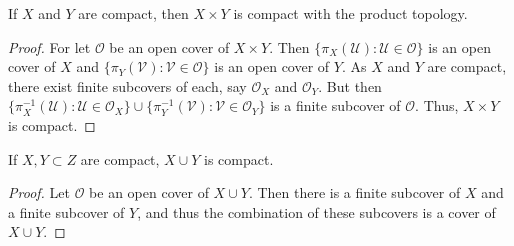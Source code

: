 \documentclass[crop=false,class=book]{standalone}
\begin{document}
\begin{theorem}
If $X$ and $Y$ are compact, then $X\times Y$ is compact with the product topology.
\end{theorem}
\begin{proof}
For let $\mathscr{O}$ be an open cover of $X\times Y$. Then $\{\pi_X(\mathscr{U}):\mathscr{U}\in \mathscr{O}\}$ is an open cover of $X$ and $\{\pi_{Y}(\mathscr{V}):\mathscr{V}\in \mathscr{O}\}$ is an open cover of $Y$. As $X$ and $Y$ are compact, there exist finite subcovers of each, say $\mathcal{O}_X$ and $\mathcal{O}_Y$. But then $\{\pi_{X}^{-1}(\mathcal{U}):\mathcal{U}\in \mathcal{O}_X\}\cup \{\pi_{Y}^{-1}(\mathcal{V}):\mathcal{V}\in \mathcal{O}_Y\}$ is a finite subcover of $\mathscr{O}$. Thus, $X\times Y$ is compact.
\end{proof}
\begin{theorem}
If $X,Y\subset Z$ are compact, $X\cup Y$ is compact.
\end{theorem}
\begin{proof}
Let $\mathcal{O}$ be an open cover of $X\cup Y$. Then there is a finite subcover of $X$ and a finite subcover of $Y$, and thus the combination of these subcovers is a cover of $X\cup Y$.
\end{proof}
\end{document}
